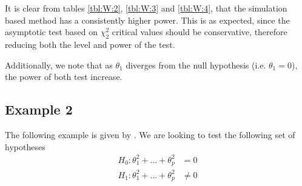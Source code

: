 \documentclass[11pt]{article}\usepackage[]{graphicx}\usepackage[]{color}
\begin{document}
\begin{table}[H]
	\centering
	\caption{Empirical levels for 1000 replications of the Wald statistic where $\alpha = 5\%$ and $\theta_1=1$, testing $H_0: \left[ \theta_1\theta_2, \theta_1\right] =0$ against $H_1: \left[ \theta_1\theta_2, \theta_1\right] \neq 0$}
	\label{tbl:W:4}
\end{table}


It is clear from tables \ref{tbl:W:2}, \ref{tbl:W:3} and \ref{tbl:W:4}, that the simulation based method has a consistently higher power. This is as expected, since the asymptotic test based on $\chi_2^2$ critical values should be conservative, therefore reducing both the level and power of the test.

Additionally, we note that as $\theta_1$ diverges from the null hypothesis (i.e. $\theta_1=0$), the power of both test increase.

\subsection{Example 2}
The following example is given by \cite{dufour_wald_2013}. We are looking to test the following set of hypotheses
\begin{align}
	H_0: \theta_1^2+...+\theta_p^2 & = 0 \\
	H_1: \theta_1^2+...+\theta_p^2  & \neq 0
\end{align}
\end{document}
